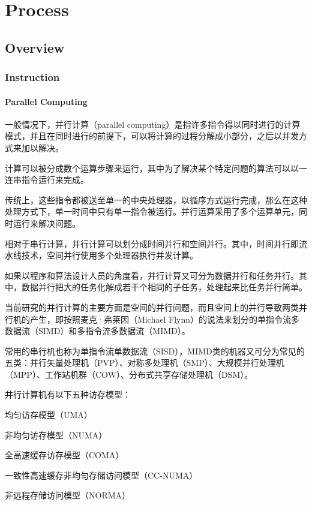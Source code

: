 \part{Process}


\chapter{Overview}


\section{Instruction}



\subsection{Parallel Computing}

一般情况下，并行计算（parallel computing）是指许多指令得以同时进行的计算模式，并且在同时进行的前提下，可以将计算的过程分解成小部分，之后以并发方式来加以解决。

计算可以被分成数个运算步骤来运行，其中为了解决某个特定问题的算法可以以一连串指令运行来完成。

传统上，这些指令都被送至单一的中央处理器，以循序方式运行完成，那么在这种处理方式下，单一时间中只有单一指令被运行。并行运算采用了多个运算单元，同时运行来解决问题。

相对于串行计算，并行计算可以划分成时间并行和空间并行。其中，时间并行即流水线技术，空间并行使用多个处理器执行并发计算。

如果以程序和算法设计人员的角度看，并行计算又可分为数据并行和任务并行。其中，数据并行把大的任务化解成若干个相同的子任务，处理起来比任务并行简单。


当前研究的并行计算的主要方面是空间的并行问题，而且空间上的并行导致两类并行机的产生，即按照麦克·弗莱因（Michael Flynn）的说法来划分的单指令流多数据流（SIMD）和多指令流多数据流（MIMD）。

常用的串行机也称为单指令流单数据流（SISD），MIMD类的机器又可分为常见的五类：并行矢量处理机（PVP）、对称多处理机（SMP）、大规模并行处理机（MPP）、工作站机群（COW）、分布式共享存储处理机（DSM）。

并行计算机有以下五种访存模型：

\begin{compactitem}
\item 均匀访存模型（UMA）
\item 非均匀访存模型（NUMA）
\item 全高速缓存访存模型（COMA）
\item 一致性高速缓存非均匀存储访问模型（CC-NUMA）
\item 非远程存储访问模型（NORMA）
\end{compactitem}

